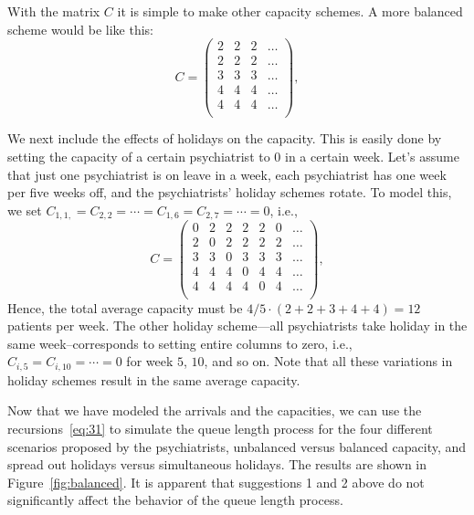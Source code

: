 With the matrix $C$ it is simple to make other capacity schemes. A
more balanced scheme would be like this:
\begin{equation*}
C = 
  \begin{pmatrix}
    2 & 2 & 2 & \ldots\\
    2 & 2 & 2 & \ldots\\
    3 & 3 & 3 & \ldots\\
    4 & 4 & 4 & \ldots\\
    4 & 4 & 4 & \ldots\\
  \end{pmatrix},
\end{equation*}

We next include the effects of holidays on the capacity. This is
easily done by setting the capacity of a certain psychiatrist to 0 in
a certain week. Let's assume that just one psychiatrist is on leave in
a week, each psychiatrist has one week per five weeks off, and the
psychiatrists' holiday schemes rotate. To model this, we set
$C_{1,1,}=C_{2,2}=\cdots=C_{1,6}=C_{2,7} =\cdots = 0$, i.e.,
\begin{equation*}
C = 
  \begin{pmatrix}
    0 & 2 & 2 & 2 & 2 & 0 & \ldots \\
    2 & 0 & 2 & 2 & 2 & 2 & \ldots\\
    3 & 3 & 0 & 3 & 3 & 3 & \ldots\\
    4 & 4 & 4 & 0 & 4 & 4 & \ldots\\
    4 & 4 & 4 & 4 & 0 & 4 & \ldots\\
  \end{pmatrix},
\end{equation*}
Hence, the total average capacity must be $4/5 \cdot (2+2+3+4+4) = 12$
patients per week.  The other holiday scheme---all psychiatrists take
holiday in the same week--corresponds to setting entire columns to
zero, i.e., $C_{i,5}=C_{i,10}=\cdots=0$ for week $5$, $10$, and so
on. Note that all these variations in holiday schemes result in the
same average capacity.

Now that we have modeled the arrivals and the capacities, we can use
the recursions~\eqref{eq:31} to simulate the queue length process for
the four different scenarios proposed by the psychiatrists, unbalanced
versus balanced capacity, and spread out holidays versus simultaneous
holidays.  The results are shown in Figure~\ref{fig:balanced}. It is
apparent that suggestions 1 and 2 above do not significantly affect
the behavior of the queue length process.  


